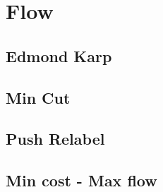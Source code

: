 \newpage
\section{Flow}
\subsection{Edmond Karp}

\subsection{Min Cut}

\newpage
\subsection{Push Relabel}

\subsection{Min cost - Max flow}

